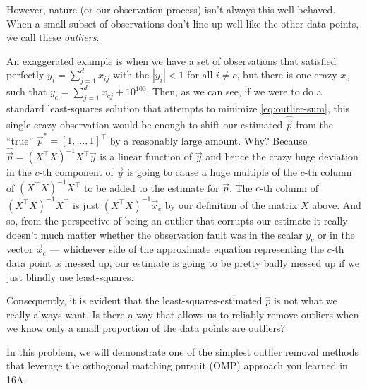 However, nature (or our observation process) isn't always this well
behaved. When a small subset of observations don't line up well like
the other data points, we call these \textit{outliers}. 

An exaggerated example is when we have a set of observations that
satisfied perfectly $y_i = \sum_{j=1}^d x_{ij}$ with the $|y_i|<1$ for
all $i\neq c$, but there is one crazy $x_c$ such that
$y_c = \sum_{j=1}^d x_{cj} + 10^{100}$. Then, as we can see, if we
were to do a standard least-squares solution that attempts to minimize
\eqref{eq:outlier-sum}, this single crazy observation would be enough
to shift our estimated $\hat{\vec{p}}$ from the ``true''
$\vec{p}^* = [1,\ldots,1]^\top$ by a reasonably large amount.  Why?
Because $\hat{\vec{p}} = (X^\top X)^{-1}X^\top \vec{y}$ is a linear function
of $\vec{y}$ and hence the crazy huge deviation in the $c$-th
component of $\vec{y}$ is going to cause a huge multiple of the $c$-th
column of $(X^\top X)^{-1}X^\top$ to be added to the estimate for
$\vec{p}$. The $c$-th column of $(X^\top X)^{-1}X^\top$ is just
$(X^\top X)^{-1}\vec{x}_c$ by our definition of the matrix $X$ above. And
so, from the perspective of being an outlier that corrupts our
estimate it really doesn't much matter whether the observation fault
was in the scalar $y_c$ or in the vector $\vec{x}_c$ --- whichever
side of the approximate equation representing the $c$-th data point is
messed up, our estimate is going to be pretty badly messed up if we
just blindly use least-squares.


Consequently, it is evident that the least-squares-estimated $\hat{p}$
is not what we really always want. Is there a way that allows us to reliably
remove outliers when we know only a small proportion of the data
points are outliers?  

In this problem, we will demonstrate one of the simplest outlier removal
methods that leverage the orthogonal matching pursuit (OMP) approach
you learned in 16A.


